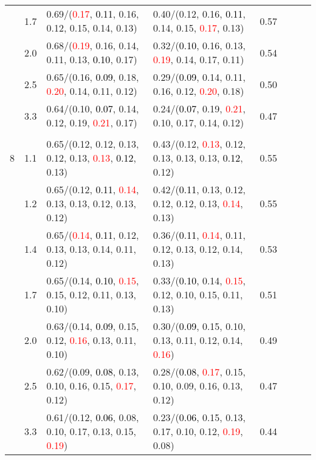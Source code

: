 \documentclass[10pt,a4paper]{report}
\begin{document}
\begin{table}[!htbp]
\begin{center}
{\begin{tabular}{ccllcccc}
			&1.7&0.69/(\textcolor{red}{0.17}, \textcolor{black}{0.11}, 0.16, 0.12, 0.15, 0.14, 0.13)&0.40/(0.12, 0.16, \textcolor{black}{0.11}, 0.14, 0.15, \textcolor{red}{0.17}, 0.13)&0.57\\
			&2.0&0.68/(\textcolor{red}{0.19}, 0.16, 0.14, 0.11, 0.13, \textcolor{black}{0.10}, 0.17)&0.32/(\textcolor{black}{0.10}, 0.16, 0.13, \textcolor{red}{0.19}, 0.14, 0.17, 0.11)&0.54\\
			&2.5&0.65/(0.16, \textcolor{black}{0.09}, 0.18, \textcolor{red}{0.20}, 0.14, 0.11, 0.12)&0.29/(\textcolor{black}{0.09}, 0.14, 0.11, 0.16, 0.12, \textcolor{red}{0.20}, 0.18)&0.50\\
			&3.3&0.64/(0.10, \textcolor{black}{0.07}, 0.14, 0.12, 0.19, \textcolor{red}{0.21}, 0.17)&0.24/(\textcolor{black}{0.07}, 0.19, \textcolor{red}{0.21}, 0.10, 0.17, 0.14, 0.12)&0.47\\
			&&&&\\
			8			&1.1&0.65/(0.12, 0.12, 0.13, 0.12, 0.13, \textcolor{red}{0.13}, \textcolor{black}{0.12}, 0.13)&0.43/(0.12, \textcolor{red}{0.13}, 0.12, 0.13, 0.13, 0.13, \textcolor{black}{0.12}, 0.12)&0.55\\
			&1.2&0.65/(0.12, \textcolor{black}{0.11}, \textcolor{red}{0.14}, 0.13, 0.13, 0.12, 0.13, 0.12)&0.42/(\textcolor{black}{0.11}, 0.13, 0.12, 0.12, 0.12, 0.13, \textcolor{red}{0.14}, 0.13)&0.55\\
			&1.4&0.65/(\textcolor{red}{0.14}, \textcolor{black}{0.11}, 0.12, 0.13, 0.13, 0.14, 0.11, 0.12)&0.36/(\textcolor{black}{0.11}, \textcolor{red}{0.14}, 0.11, 0.12, 0.13, 0.12, 0.14, 0.13)&0.53\\
			&1.7&0.65/(0.14, \textcolor{black}{0.10}, \textcolor{red}{0.15}, 0.15, 0.12, 0.11, 0.13, 0.10)&0.33/(\textcolor{black}{0.10}, 0.14, \textcolor{red}{0.15}, 0.12, 0.10, 0.15, 0.11, 0.13)&0.51\\
			&2.0&0.63/(0.14, \textcolor{black}{0.09}, 0.15, 0.12, \textcolor{red}{0.16}, 0.13, 0.11, 0.10)&0.30/(\textcolor{black}{0.09}, 0.15, 0.10, 0.13, 0.11, 0.12, 0.14, \textcolor{red}{0.16})&0.49\\
			&2.5&0.62/(0.09, \textcolor{black}{0.08}, 0.13, 0.10, 0.16, 0.15, \textcolor{red}{0.17}, 0.12)&0.28/(\textcolor{black}{0.08}, \textcolor{red}{0.17}, 0.15, 0.10, 0.09, 0.16, 0.13, 0.12)&0.47\\
			&3.3&0.61/(0.12, \textcolor{black}{0.06}, 0.08, 0.10, 0.17, 0.13, 0.15, \textcolor{red}{0.19})&0.23/(\textcolor{black}{0.06}, 0.15, 0.13, 0.17, 0.10, 0.12, \textcolor{red}{0.19}, 0.08)&0.44\\
			\bottomrule
		\end{tabular}}
	\end{center}
\end{table}
\end{document}
